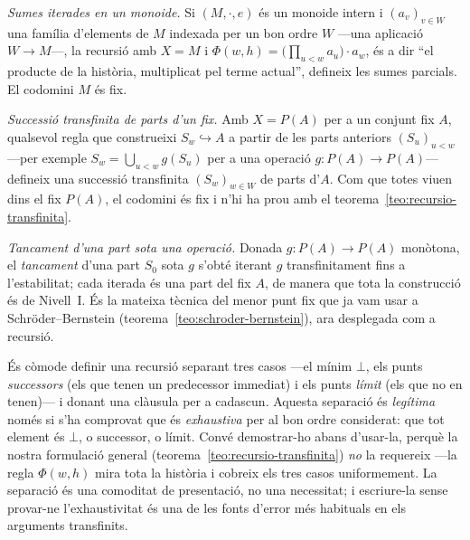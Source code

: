 \begin{observacio}\label{obs:exemples-recursio}
\emph{Sumes iterades en un monoide.} Si \((M,\cdot,e)\) és un monoide intern i
\((a_v)_{v\in W}\) una família d'elements de \(M\) indexada per un bon ordre
\(W\) ---una aplicació \(W\to M\)---, la recursió amb \(X=M\) i
\(\Phi(w,h)=\bigl(\prod_{u<w}a_u\bigr)\cdot a_w\), és a dir \enquote{el
producte de la història, multiplicat pel terme actual}, defineix les sumes
parcials. El codomini \(M\) és fix.

\emph{Successió transfinita de parts d'un fix.} Amb \(X=P(A)\) per a un
conjunt fix \(A\), qualsevol regla que construeixi \(S_w\hookrightarrow A\) a
partir de les parts anteriors \((S_u)_{u<w}\) ---per exemple
\(S_w=\bigcup_{u<w}g(S_u)\) per a una operació \(g\colon P(A)\to P(A)\)---
defineix una successió transfinita \((S_w)_{w\in W}\) de parts d'\(A\). Com que
totes viuen dins el fix \(P(A)\), el codomini és fix i n'hi ha prou amb el
teorema~\ref{teo:recursio-transfinita}.

\emph{Tancament d'una part sota una operació.} Donada \(g\colon P(A)\to P(A)\)
monòtona, el \emph{tancament} d'una part \(S_0\) sota \(g\) s'obté iterant
\(g\) transfinitament fins a l'estabilitat; cada iterada és una part del fix
\(A\), de manera que tota la construcció és de Nivell~I. És la mateixa tècnica
del menor punt fix que ja vam usar a Schröder--Bernstein
(teorema~\ref{teo:schroder-bernstein}), ara desplegada com a recursió.
\end{observacio}

\begin{observacio}\label{obs:successor-limit}
És còmode definir una recursió separant tres casos ---el mínim \(\bot\), els
punts \emph{successors} (els que tenen un predecessor immediat) i els punts
\emph{límit} (els que no en tenen)--- i donant una clàusula per a cadascun.
Aquesta separació és \emph{legítima} només si s'ha comprovat que és
\emph{exhaustiva} per al bon ordre considerat: que tot element és \(\bot\), o
successor, o límit. Convé demostrar-ho abans d'usar-la, perquè la nostra
formulació general (teorema~\ref{teo:recursio-transfinita}) \emph{no} la
requereix ---la regla \(\Phi(w,h)\) mira tota la història i cobreix els tres
casos uniformement. La separació és una comoditat de presentació, no una
necessitat; i escriure-la sense provar-ne l'exhaustivitat és una de les fonts
d'error més habituals en els arguments transfinits.
\end{observacio}

